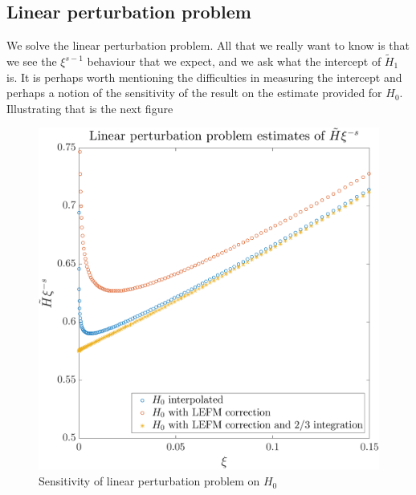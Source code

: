 \documentclass{jfm}
\begin{document}
\subsection{Linear perturbation problem}
We solve the linear perturbation problem. All that we really want to know
is that we see the $\xi^{s-1}$ behaviour that we expect, and we ask what the
intercept of $\tilde{H}_1$ is. It is perhaps worth mentioning the difficulties
in measuring the intercept and perhaps a notion of the sensitivity of the 
result on the estimate provided for $H_0$. Illustrating that is the next
figure 
\begin{figure}
 \centerline{\includegraphics[scale=0.3]{./../../Graphs/linear-perturbation.pdf}}
  \caption{Sensitivity of linear perturbation problem on $H_0$}
\end{figure}
\end{document}
